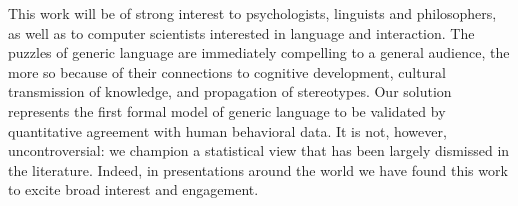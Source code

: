 \documentclass[11pt,letterpaper]{letter} %
\begin{document}
\begin{letter}
This work will be of strong interest to psychologists, linguists and philosophers, as well as to computer scientists interested in language and interaction.
The puzzles of generic language are immediately compelling to a general audience, the more so because of their connections to cognitive development, cultural transmission of knowledge, and propagation of stereotypes.
Our solution represents the first formal model of generic language to be validated by quantitative agreement with human behavioral data.
It is not, however, uncontroversial: we champion a statistical view that has been largely dismissed in the literature.
Indeed, in presentations around the world we have found this work to excite broad interest and engagement.









%




\end{letter}
\end{document}
